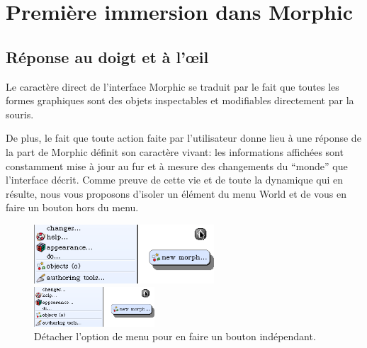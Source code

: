 \documentclass[a4paper,10pt,twoside]{book}
\begin{document}
\section{Premi\`ere immersion dans Morphic}

\subsection{R\'eponse au doigt et \`a l'\oe il}
Le caract\`ere direct de l'interface Morphic se traduit par le fait
que toutes les formes graphiques sont des objets 
inspectables et modifiables directement par la souris.

De plus, le fait que toute action faite par l'utilisateur donne lieu
\`a une r\'eponse de la part de Morphic d\'efinit son caract\`ere
vivant: les informations affich\'ees sont constamment mise \`a jour
au fur et \`a mesure des changements du ``monde'' que l'interface
d\'ecrit. 
Comme preuve de cette vie et de toute la dynamique qui en r\'esulte,
nous vous proposons d'isoler un \'el\'ement du menu World et de vous
en faire un bouton hors du menu.


\begin{figure}[ht]
	\ifluluelse
		{\centerline{\includegraphics[width=0.6\textwidth]{detachingMenu}}}
		{\centerline{\includegraphics[width=0.4\textwidth]{detachingMenu}}}
	\caption{D\'etacher l'option de menu  pour
      en faire un bouton ind\'ependant.\label{fig:detachingMenu}}
\end{figure}
\end{document}

